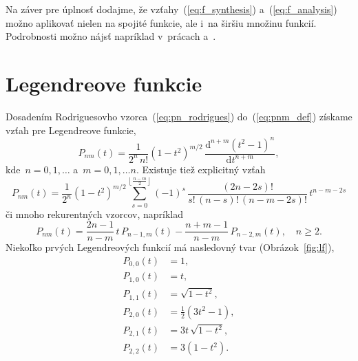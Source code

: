 \documentclass[a4paper, 12pt]{book}
\newcommand{\diff}{\mathrm d}
\begin{document}
Na záver pre úplnosť dodajme, že vzťahy~(\ref{eq:f_synthesis}) 
a~(\ref{eq:f_analysis}) možno aplikovať nielen na spojité funkcie, ale i~na 
širšiu množinu funkcií.  Podrobnosti možno nájsť napríklad v~prácach 
\textcite{Freeden2009} a~\textcite{Arfken2005}.






\section{Legendreove funkcie}
\label{sec:legendre_functions}

Dosadením Rodriguesovho vzorca~(\ref{eq:pn_rodrigues}) do~(\ref{eq:pnm_def})
získame vzťah pre Legendreove funkcie,
%
\begin{equation}
\label{eq:pnm_ferrer}
P_{nm}(t) = \frac{1}{2^n \, n!} (1 - t^2)^{ m \slash 2} \, \frac{\diff^{n + m}
(t^2 - 1)^n}{\diff t^{n + m}}{,}
\end{equation}
%
kde~$n = 0, 1, \dots$ a~$m = 0, 1, \dots n$.  Existuje tiež explicitný vzťah 
\parencite{Freeden2009}
%
\begin{equation}
P_{nm}(t) = \frac{1}{2^n}(1 - t^2)^{m \slash 2} \sum_{s = 0}^{\left\lfloor
\frac{n - m}{2} \right\rfloor} (-1)^s \, \frac{(2n - 2s)!}{s! \, (n - s)! \, (n
- m - 2s)!} \, t^{n - m - 2s}
\end{equation}
%
či mnoho rekurentných vzorcov, napríklad \parencite{Freeden2009}
%
\begin{equation}
\label{eq:pnm_recurrence}
P_{nm}(t) = \frac{2n - 1}{n - m} \, t \, P_{n - 1, m}(t) - \frac{n + m - 1}{n
- m} \, P_{n - 2, m}(t){,} \quad n \geq 2{.}
\end{equation}
%
Niekoľko prvých Legendreových funkcií má nasledovný tvar
(Obrázok~\ref{fig:lf}),
%
\begin{equation}
\label{eq:lf00_to_lf22}
\begin{split}
P_{0,0}(t) & = 1{,}\\
P_{1,0}(t) & = t{,}\\
P_{1,1}(t) & = \sqrt{1 - t^2}{,}\\
P_{2,0}(t) & = \frac{1}{2}(3t^2 - 1){,}\\
P_{2,1}(t) & = 3t \, \sqrt{1 - t^2}{,}\\
P_{2,2}(t) & = 3(1 - t^2){.}\\
\end{split}
\end{equation}
\end{document}

